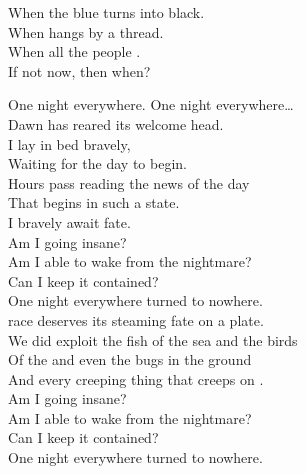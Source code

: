 When the blue  turns into black. \\
When  hangs by a thread. \\
When all the people . \\
If not now, then when? \\





One night everywhere. One night everywhere… \\

Dawn has reared its welcome head. \\
I lay in bed bravely, \\
Waiting for the day to begin. \\

Hours pass reading the news of the day \\
That begins in such a state. \\
I bravely await fate. \\

Am I going insane? \\
Am I able to wake from the nightmare? \\
Can I keep it contained? \\
One night everywhere turned to nowhere. \\

 race deserves its steaming fate on a plate. \\
We did exploit the fish of the sea and the birds \\
Of the  and even the bugs in the ground \\
And every creeping thing that creeps on . \\

Am I going insane? \\
Am I able to wake from the nightmare? \\
Can I keep it contained? \\
One night everywhere turned to nowhere. \\




